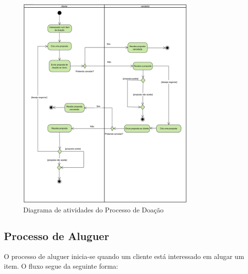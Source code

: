\documentclass[a4paper, 12pt]{article} %
\begin{document}
\begin{figure}[ht]
	\centering
	\includegraphics[width=0.8\textwidth]{../images/activity-diagram-giveaway.png}
	\caption{Diagrama de atividades do Processo de Doação}
	\label{fig:diagrama_atividades_doacoes}
\end{figure}

\newpage
\clearpage

\subsection{Processo de Aluguer}
O processo de aluguer inicia-se quando um cliente está interessado em alugar um item. O fluxo segue da seguinte forma:
\end{document}

